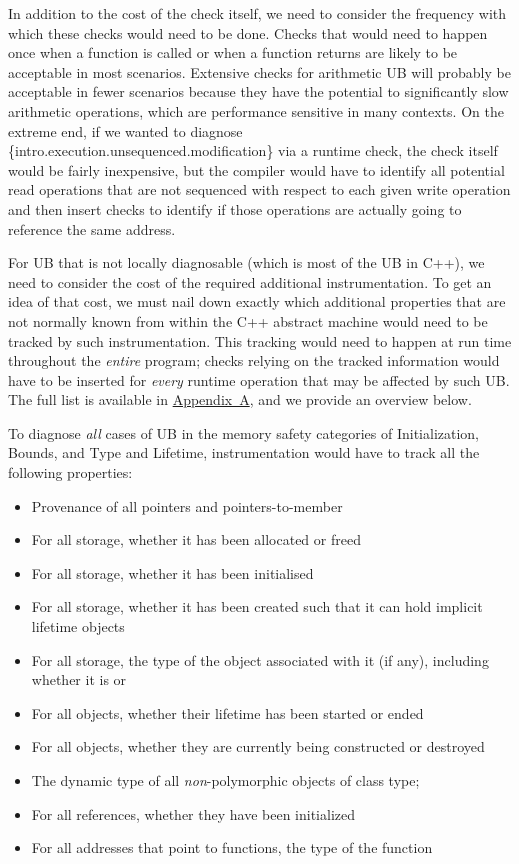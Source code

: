 In addition to the cost of the check itself, we need to consider the frequency with which these checks would need to be done. Checks that would need to happen once when a function is called or when a function returns are likely to be acceptable in most scenarios. Extensive checks for arithmetic UB will probably be acceptable in fewer scenarios because they have the potential to significantly slow arithmetic operations, which are performance sensitive in many contexts. On the extreme end, if we wanted to diagnose \{intro.execution.unsequenced.modification\} via a runtime check, the check itself would be fairly inexpensive, but the compiler would have to identify all potential read operations that are not sequenced with respect to each given write operation and then insert checks to identify if those operations are actually going to reference the same address.

For UB that is not locally diagnosable (which is most of the UB in C++), we need to consider the cost of the required additional instrumentation. To get an idea of that cost, we must nail down exactly which additional properties that are not normally known from within the C++ abstract machine would need to be tracked by such instrumentation. This tracking would need to happen at run time throughout the \emph{entire} program; checks relying on the tracked information would have to be inserted for \emph{every} runtime operation that may be affected by such UB.
The full list is available in \hyperref[appendix]{Appendix~A}, and we provide an overview below.

To diagnose \emph{all} cases of UB in the memory safety categories of Initialization, Bounds, and Type and Lifetime, instrumentation would have to track all the following properties:

\begin{itemize}
\item Provenance of all pointers and pointers-to-member
\item For all storage, whether it has been allocated or freed
\item For all storage, whether it has been initialised
\item For all storage, whether it has been created such that it can hold implicit lifetime objects
\item For all storage, the type of the object associated with it (if any), including whether it is  or 
\item For all objects, whether their lifetime has been started or ended
\item For all objects, whether they are currently being constructed or destroyed
\item The dynamic type of all \emph{non}-polymorphic objects of class type;
\item For all references, whether they have been initialized
\item For all addresses that point to  functions, the type of the function
\end{itemize}

